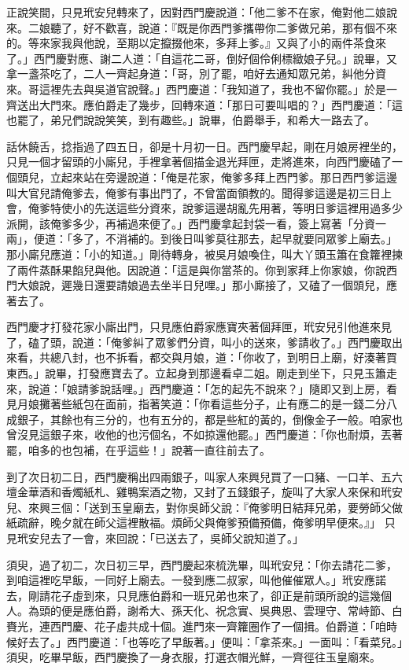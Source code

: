 正說笑間，只見玳安兒轉來了，因對西門慶說道：「他二爹不在家，俺對他二娘說來。二娘聽了，好不歡喜，說道：『既是你西門爹攜帶你二爹做兄弟，那有個不來的。等來家我與他說，至期以定攛掇他來，多拜上爹。』又與了小的兩件茶食來了。」西門慶對應、謝二人道：「自這花二哥，倒好個伶俐標緻娘子兒。」說畢，又拿一盞茶吃了，二人一齊起身道：「哥，別了罷，咱好去通知眾兄弟，糾他分資來。哥這裡先去與吳道官說聲。」西門慶道：「我知道了，我也不留你罷。」於是一齊送出大門來。應伯爵走了幾步，回轉來道：「那日可要叫唱的？」西門慶道：「這也罷了，弟兄們說說笑笑，到有趣些。」說畢，伯爵舉手，和希大一路去了。

話休饒舌，捻指過了四五日，卻是十月初一日。西門慶早起，剛在月娘房裡坐的，只見一個才留頭的小廝兒，手裡拿著個描金退光拜匣，走將進來，向西門慶磕了一個頭兒，立起來站在旁邊說道：「俺是花家，俺爹多拜上西門爹。那日西門爹這邊叫大官兒請俺爹去，俺爹有事出門了，不曾當面領教的。聞得爹這邊是初三日上會，俺爹特使小的先送這些分資來，說爹這邊胡亂先用著，等明日爹這裡用過多少派開，該俺爹多少，再補過來便了。」西門慶拿起封袋一看，簽上寫著「分資一兩」，便道：「多了，不消補的。到後日叫爹莫往那去，起早就要同眾爹上廟去。」那小廝兒應道：「小的知道。」剛待轉身，被吳月娘喚住，叫大丫頭玉簫在食籮裡揀了兩件蒸酥果餡兒與他。因說道：「這是與你當茶的。你到家拜上你家娘，你說西門大娘說，遲幾日還要請娘過去坐半日兒哩。」那小廝接了，又磕了一個頭兒，應著去了。

西門慶才打發花家小廝出門，只見應伯爵家應寶夾著個拜匣，玳安兒引他進來見了，磕了頭，說道：「俺爹糾了眾爹們分資，叫小的送來，爹請收了。」西門慶取出來看，共總八封，也不拆看，都交與月娘，道：「你收了，到明日上廟，好湊著買東西。」說畢，打發應寶去了。立起身到那邊看卓二姐。剛走到坐下，只見玉簫走來，說道：「娘請爹說話哩。」西門慶道：「怎的起先不說來？」隨即又到上房，看見月娘攤著些紙包在面前，指著笑道：「你看這些分子，止有應二的是一錢二分八成銀子，其餘也有三分的，也有五分的，都是些紅的黃的，倒像金子一般。咱家也曾沒見這銀子來，收他的也污個名，不如掠還他罷。」西門慶道：「你也耐煩，丟著罷，咱多的也包補，在乎這些！」說著一直往前去了。

到了次日初二日，西門慶稱出四兩銀子，叫家人來興兒買了一口豬、一口羊、五六壇金華酒和香燭紙札、雞鴨案酒之物，又封了五錢銀子，旋叫了大家人來保和玳安兒、來興三個：「送到玉皇廟去，對你吳師父說：『俺爹明日結拜兄弟，要勞師父做紙疏辭，晚夕就在師父這裡散福。煩師父與俺爹預備預備，俺爹明早便來。』」 只見玳安兒去了一會，來回說：「已送去了，吳師父說知道了。」

須臾，過了初二，次日初三早，西門慶起來梳洗畢，叫玳安兒：「你去請花二爹，到咱這裡吃早飯，一同好上廟去。一發到應二叔家，叫他催催眾人。」玳安應諾去，剛請花子虛到來，只見應伯爵和一班兄弟也來了，卻正是前頭所說的這幾個人。為頭的便是應伯爵，謝希大、孫天化、祝念實、吳典恩、雲理守、常峙節、白賚光，連西門慶、花子虛共成十個。進門來一齊籮圈作了一個揖。伯爵道：「咱時候好去了。」西門慶道：「也等吃了早飯著。」便叫：「拿茶來。」一面叫：「看菜兒。」須臾，吃畢早飯，西門慶換了一身衣服，打選衣帽光鮮，一齊徑往玉皇廟來。


